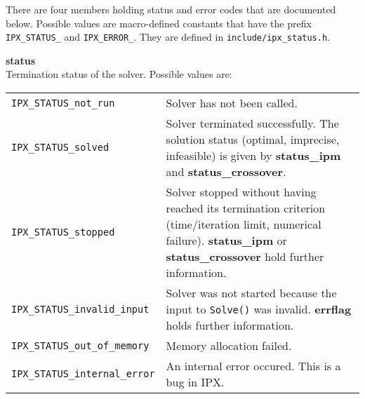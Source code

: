 \documentclass{article}
\newcommand{\ct}{\texttt}
\newcommand{\info}[2]{
  \noindent\begin{minipage}{\textwidth}
    \textbf{#1}\\
    #2
  \end{minipage}
  \vskip 1\baselineskip
}
\begin{document}
There are four members holding status and error codes that are documented below.
Possible values are macro-defined constants that have the prefix
\ct{IPX\_STATUS\_} and \ct{IPX\_ERROR\_}. They are defined in
\ct{include/ipx\_status.h}.\\[2em]

\info{status}{
  Termination status of the solver. Possible values are:\\[1em]
  \begin{tabular}{lp{8cm}}
    \ct{IPX\_STATUS\_not\_run} & Solver has not been called.\\
    \ct{IPX\_STATUS\_solved} & Solver terminated successfully. The solution
    status (optimal, imprecise, infeasible) is given by \textbf{status\_ipm} and
    \textbf{status\_crossover}.\\
    \ct{IPX\_STATUS\_stopped} & Solver stopped without having reached its
    termination criterion (time/iteration limit, numerical failure).
    \textbf{status\_ipm} or \textbf{status\_crossover} hold further
    information.\\
    \ct{IPX\_STATUS\_invalid\_input} & Solver was not started because the input
    to \ct{Solve()} was invalid. \textbf{errflag} holds further information.\\
    \ct{IPX\_STATUS\_out\_of\_memory} & Memory allocation failed.\\
    \ct{IPX\_STATUS\_internal\_error} & An internal error occured. This is a
    bug in IPX.\\
  \end{tabular}
}
\end{document}
